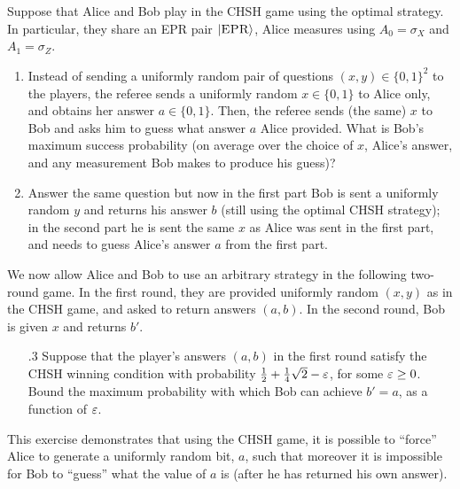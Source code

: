 \chapter{}


\begin{exercise}
Suppose that Alice and Bob play in the CHSH game using the optimal strategy. In particular, they share an EPR pair $|\textsc{EPR}\rangle$, Alice measures using $A_0 = \sigma_X$ and $A_1 = \sigma_Z$. 
\begin{enumerate}
\item Instead of sending a uniformly random pair of questions $(x,y)\in\{0,1\}^2$ to the players, the referee sends a uniformly random $x\in \{0,1\}$ to Alice only, and obtains her answer $a\in \{0,1\}$. Then, the referee sends (the same) $x$ to Bob and asks him to guess what answer $a$ Alice provided. What is Bob's maximum success probability (on average over the choice of $x$, Alice's answer, and any measurement Bob makes to produce his guess)? 
\item Answer the same question but now in the first part Bob is sent a uniformly random $y$ and returns his answer $b$ (still using the optimal CHSH strategy); in the second part he is sent the same $x$ as Alice was sent in the first part, and needs to guess Alice's answer $a$ from the first part. 
\end{enumerate}
We now allow Alice and Bob to use an arbitrary strategy in the following two-round game. In the first round, they are provided uniformly random $(x,y)$ as in the CHSH game, and asked to return answers $(a,b)$. In the second round, Bob is given $x$ and returns $b'$. 
\begin{enumerate}
\item[.3] Suppose that the player's answers $(a,b)$ in the first round satisfy the CHSH winning condition with probability $\frac{1}{2}+\frac{1}{4}\sqrt{2}-\varepsilon$, for some $\varepsilon\geq 0$. Bound the maximum probability with which Bob can achieve $b'=a$, as a function of $\varepsilon$. 
\end{enumerate}
This exercise demonstrates that using the CHSH game, it is possible to ``force'' Alice to generate a uniformly random bit, $a$, such that moreover it is impossible for Bob to ``guess'' what the value of $a$ is (after he has returned his own answer). 
\end{exercise}

